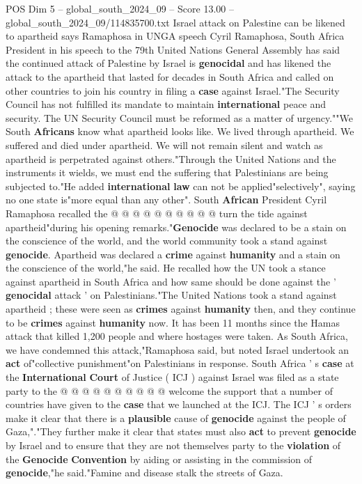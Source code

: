 \begin{textsample}{POS Dim 5 – global\_south\_2024\_09 – Score 13.00 – global\_south\_2024\_09/114835700.txt}  \label{ex:f5_pos_239}
Israel attack on Palestine can be likened to apartheid says Ramaphosa in UNGA speech Cyril Ramaphosa, South Africa President in his speech to the 79th United Nations General Assembly has said the continued attack of Palestine by Israel is \textbf{genocidal} and has likened the attack to the apartheid that lasted for decades in South Africa and called on other countries to join his country in filing a \textbf{case} against Israel."The Security Council has not fulfilled its mandate to maintain \textbf{international} peace and security.
The UN Security Council must be reformed as a matter of urgency.""We South \textbf{Africans} know what apartheid looks like.
We lived through apartheid.
We suffered and died under apartheid.
We will not remain silent and watch as apartheid is perpetrated against others."Through the United Nations and the instruments it wields, we must end the suffering that Palestinians are being subjected to."He added \textbf{international} \textbf{law} can not be applied"selectively", saying no one state is"more equal than any other".
South \textbf{African} President Cyril Ramaphosa recalled the @ @ @ @ @ @ @ @ @ @ turn the tide against apartheid"during his opening remarks."\textbf{Genocide} was declared to be a stain on the conscience of the world, and the world community took a stand against \textbf{genocide}.
Apartheid was declared a \textbf{crime} against \textbf{humanity} and a stain on the conscience of the world,"he said.
He recalled how the UN took a stance against apartheid in South Africa and how same should be done against the ' \textbf{genocidal} attack ' on Palestinians."The United Nations took a stand against apartheid ; these were seen as \textbf{crimes} against \textbf{humanity} then, and they continue to be \textbf{crimes} against \textbf{humanity} now.
It has been 11 months since the Hamas attack that killed 1,200 people and where hostages were taken.
As South Africa, we have condemned this attack,"Ramaphosa said, but noted Israel undertook an \textbf{act} of"collective punishment"on Palestinians in response.
South Africa ' s \textbf{case} at the \textbf{International} \textbf{Court} of Justice ( ICJ ) against Israel was filed as a state party to the @ @ @ @ @ @ @ @ @ @ welcome the support that a number of countries have given to the \textbf{case} that we launched at the ICJ.
The ICJ ' s orders make it clear that there is a \textbf{plausible} cause of \textbf{genocide} against the people of Gaza,"."They further make it clear that states must also \textbf{act} to prevent \textbf{genocide} by Israel and to ensure that they are not themselves party to the \textbf{violation} of the \textbf{Genocide} \textbf{Convention} by aiding or assisting in the commission of \textbf{genocide},"he said."Famine and disease stalk the streets of Gaza.

\end{textsample}
